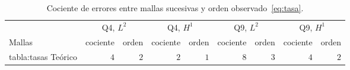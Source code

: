 \documentclass[11pt,a4paper]{article}
\newcommand{\tabla}[1]{\csname tabla:#1\endcsname}
\begin{document}
\begin{table}[H]
\centering\small
\caption{Cociente de errores entre mallas sucesivas y orden observado~\eqref{eq:tasa}.}\label{tab:tasas}
\setlength{\tabcolsep}{4pt}
\begin{tabular}{@{}l rr rr rr rr@{}}
\toprule
 & \multicolumn{2}{c}{Q4, $L^2$} & \multicolumn{2}{c}{Q4, $H^1$} & \multicolumn{2}{c}{Q9, $L^2$} & \multicolumn{2}{c}{Q9, $H^1$}\\
\cmidrule(lr){2-3}\cmidrule(lr){4-5}\cmidrule(lr){6-7}\cmidrule(l){8-9}
Mallas & cociente & orden & cociente & orden & cociente & orden & cociente & orden\\
\midrule
\tabla{tasas}
\midrule
Teórico & $4$ & $2$ & $2$ & $1$ & $8$ & $3$ & $4$ & $2$\\
\bottomrule
\end{tabular}
\end{table}
\end{document}
